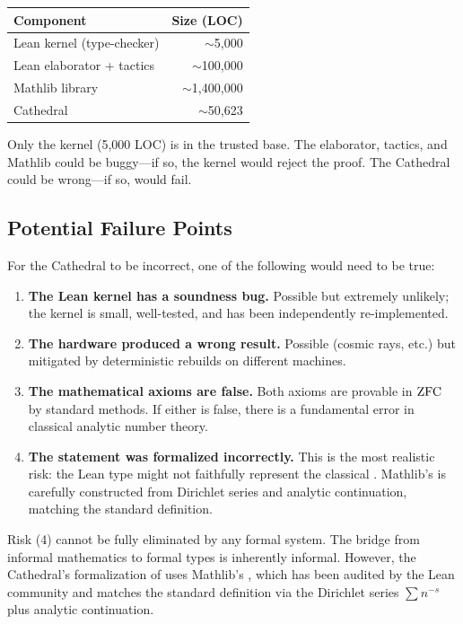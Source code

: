 \documentclass[11pt,a4paper]{article}
\begin{document}
\begin{center}
\begin{tabular}{@{}lr@{}}
\toprule
\textbf{Component} & \textbf{Size (LOC)} \\
\midrule
Lean kernel (type-checker) & $\sim$5{,}000 \\
Lean elaborator + tactics & $\sim$100{,}000 \\
Mathlib library & $\sim$1{,}400{,}000 \\
Cathedral & $\sim$50{,}623 \\
\bottomrule
\end{tabular}
\end{center}

Only the kernel (5{,}000 LOC) is in the trusted base. The elaborator,
tactics, and Mathlib could be buggy---if so, the kernel would reject
the proof. The Cathedral could be wrong---if so, 
would fail.

\subsection{Potential Failure Points}

For the Cathedral to be incorrect, one of the following would need
to be true:

\begin{enumerate}
  \item \textbf{The Lean kernel has a soundness bug.} Possible but
    extremely unlikely; the kernel is small, well-tested, and has
    been independently re-implemented.
  \item \textbf{The hardware produced a wrong result.} Possible
    (cosmic rays, etc.) but mitigated by deterministic rebuilds on
    different machines.
  \item \textbf{The mathematical axioms are false.} Both axioms are
    provable in $\mathrm{ZFC}$ by standard methods. If either is false,
    there is a fundamental error in classical analytic number theory.
  \item \textbf{The statement was formalized incorrectly.} This is the
    most realistic risk: the Lean type  might
    not faithfully represent the classical \RH. Mathlib's
     is carefully constructed from Dirichlet series
    and analytic continuation, matching the standard definition.
\end{enumerate}

\begin{remark}
Risk (4) cannot be fully eliminated by any formal system. The bridge
from informal mathematics to formal types is inherently informal.
However, the Cathedral's formalization of \RH{} uses Mathlib's
, which has been audited by the Lean community
and matches the standard definition via the Dirichlet series
$\sum n^{-s}$ plus analytic continuation.
\end{remark}
\end{document}
